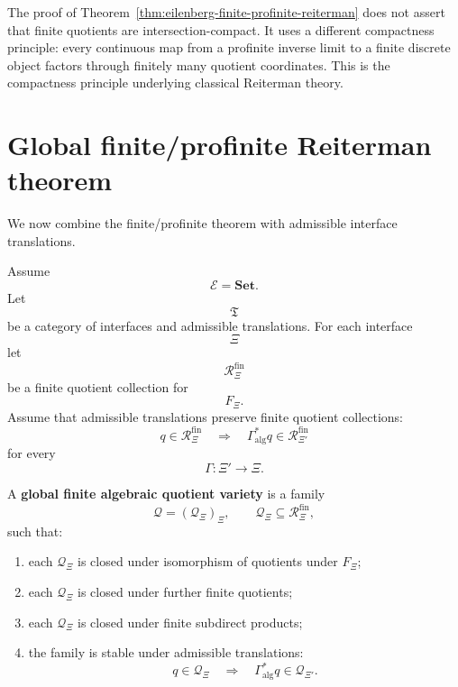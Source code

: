 \begin{remark}
\label{rem:eilenberg-why-finite-separate}
The proof of Theorem~\ref{thm:eilenberg-finite-profinite-reiterman} does not
assert that finite quotients are intersection-compact. It uses a different
compactness principle: every continuous map from a profinite inverse limit to
a finite discrete object factors through finitely many quotient coordinates.
This is the compactness principle underlying classical Reiterman theory.
\end{remark}

\section{Global finite/profinite Reiterman theorem}
\label{sec:eilenberg-global-finite-profinite-reiterman}

We now combine the finite/profinite theorem with admissible interface
translations.

Assume
\[
\mathcal E=\mathbf{Set}.
\]
Let
\[
\mathfrak T
\]
be a category of interfaces and admissible translations. For each interface
\[
\Xi
\]
let
\[
\mathcal R_\Xi^{\mathrm{fin}}
\]
be a finite quotient collection for
\[
F_\Xi.
\]
Assume that admissible translations preserve finite quotient collections:
\[
q\in\mathcal R_\Xi^{\mathrm{fin}}
\quad\Longrightarrow\quad
\Gamma_{\mathrm{alg}}^\ast q\in\mathcal R_{\Xi'}^{\mathrm{fin}}
\]
for every
\[
\Gamma:\Xi'\to\Xi.
\]

\begin{definition}
\label{def:eilenberg-global-finite-quotient-variety}
A \textbf{global finite algebraic quotient variety} is a family
\[
\mathcal Q=(\mathcal Q_\Xi)_\Xi,
\qquad
\mathcal Q_\Xi\subseteq\mathcal R_\Xi^{\mathrm{fin}},
\]
such that:
\begin{enumerate}
\item each \(\mathcal Q_\Xi\) is closed under isomorphism of quotients under
\(F_\Xi\);
\item each \(\mathcal Q_\Xi\) is closed under further finite quotients;
\item each \(\mathcal Q_\Xi\) is closed under finite subdirect products;
\item the family is stable under admissible translations:
\[
q\in\mathcal Q_\Xi
\quad\Longrightarrow\quad
\Gamma_{\mathrm{alg}}^\ast q\in\mathcal Q_{\Xi'}.
\]
\end{enumerate}
\end{definition}

